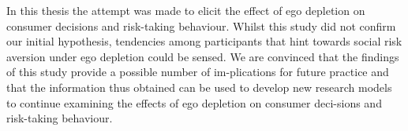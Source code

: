 In this thesis the attempt was made to elicit the effect of ego depletion on consumer decisions and risk-taking behaviour. Whilst this study did not confirm our initial hypothesis, tendencies among participants that hint towards social risk aversion under ego depletion could be sensed. We are convinced that the findings of this study provide a possible number of im-plications for future practice and that the information thus obtained can be used to develop new research models to continue examining the effects of ego depletion on consumer deci-sions and risk-taking behaviour.\par
